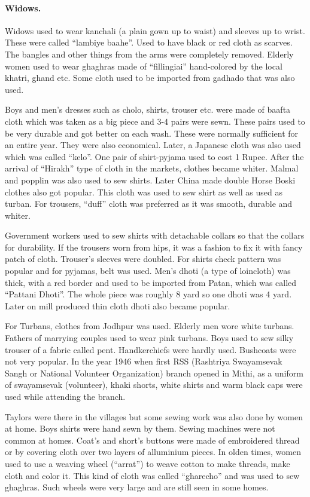 \paragraph{Widows.} Widows used to wear kanchali (a plain gown up to waist) and
sleeves up to wrist. These were called ``lambiye baahe''. Used to have black or
red cloth as scarves. The bangles and other things from the arms were completely
removed. Elderly women used to wear ghaghras made of ``fillingiai'' hand-colored
by the local khatri, ghand etc. Some cloth used to be imported from gadhado that
was also used.

Boys and men's dresses such as cholo, shirts, trouser etc. were made of baafta
cloth which was taken as a big piece and 3-4 pairs were sewn. These pairs used
to be very durable and got better on each wash. These were normally sufficient
for an entire year. They were also economical. Later, a Japanese cloth was also
used which was called ``kelo''. One pair of shirt-pyjama used to cost 1
Rupee. After the arrival of ``Hirakh'' type of cloth in the markets, clothes
became whiter. Malmal and popplin was also used to sew shirts. Later China
made double Horse Boski clothes also got popular. This cloth was used to sew
shirt as well as used as turban. For trousers, ``duff'' cloth was preferred
as it was smooth, durable and whiter.

Government workers used to sew shirts with detachable collars so that the
collars for durability. If the trousers worn from hips, it was a fashion to fix
it with fancy patch of cloth. Trouser's sleeves were doubled. For shirts check
pattern was popular and for pyjamas, belt was used. Men's dhoti (a type of
loincloth) was thick, with a red border and used to be imported from Patan,
which was called ``Pattani Dhoti''. The whole piece was roughly 8 yard so one
dhoti was 4 yard. Later on mill produced thin cloth dhoti also became popular.

For Turbans, clothes from Jodhpur was used. Elderly men wore white turbans.
Fathers of marrying couples used to wear pink turbans. Boys used to sew silky
trouser of a fabric called pent. Handkerchiefs were hardly used. Bushcoats were
not very popular. In the year 1946 when first RSS (Rashtriya Swayamsevak Sangh
or National Volunteer Organization) branch opened in Mithi, as a uniform of
swayamsevak (volunteer), khaki shorts, white shirts and warm black caps were
used while attending the branch.

Taylors were there in the villages but some sewing work was also done by women
at home. Boys shirts were hand sewn by them. Sewing machines were not common at
homes. Coat's and short's buttons were made of embroidered thread or by covering
cloth over two layers of alluminium pieces. In olden times, women used to use a
weaving wheel (``arrat'') to weave cotton to make threads, make cloth and color
it. This kind of cloth was called ``gharecho'' and was used to sew ghaghras.
Such wheels were very large and are still seen in some homes.

